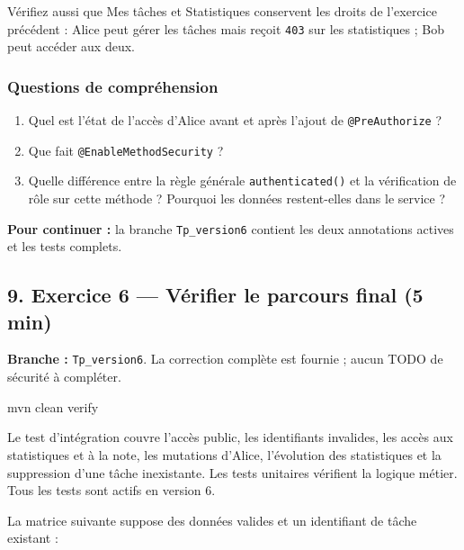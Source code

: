 \documentclass[
  french,
  10pt,
  a4paper,
]{article}
\newenvironment{Shaded}{}{}
\newcommand{\ExtensionTok}[1]{#1}
\newcommand{\NormalTok}[1]{#1}
\providecommand{\tightlist}{%
  \setlength{\itemsep}{0pt}\setlength{\parskip}{0pt}}
\begin{document}
Vérifiez aussi que Mes tâches et Statistiques conservent les droits de
l'exercice précédent : Alice peut gérer les tâches mais reçoit
\texttt{403} sur les statistiques ; Bob peut accéder aux deux.

\subsubsection{Questions de
compréhension}\label{questions-de-compruxe9hension-3}

\begin{enumerate}
\def\labelenumi{\arabic{enumi}.}
\tightlist
\item
  Quel est l'état de l'accès d'Alice avant et après l'ajout de
  \texttt{@PreAuthorize} ?
\item
  Que fait \texttt{@EnableMethodSecurity} ?
\item
  Quelle différence entre la règle générale \texttt{authenticated()} et
  la vérification de rôle sur cette méthode ? Pourquoi les données
  restent-elles dans le service ?
\end{enumerate}

\textbf{Pour continuer :} la branche \texttt{Tp\_version6} contient les
deux annotations actives et les tests complets.

\subsection{9. Exercice 6 --- Vérifier le parcours final (5
min)}\label{exercice-6-vuxe9rifier-le-parcours-final-5-min}

\textbf{Branche :} \texttt{Tp\_version6}. La correction complète est
fournie ; aucun TODO de sécurité à compléter.

\begin{Shaded}
\begin{Highlighting}[]
\ExtensionTok{mvn}\NormalTok{ clean verify}
\end{Highlighting}
\end{Shaded}

Le test d'intégration couvre l'accès public, les identifiants invalides,
les accès aux statistiques et à la note, les mutations d'Alice,
l'évolution des statistiques et la suppression d'une tâche inexistante.
Les tests unitaires vérifient la logique métier. Tous les tests sont
actifs en version 6.

La matrice suivante suppose des données valides et un identifiant de
tâche existant :
\end{document}
